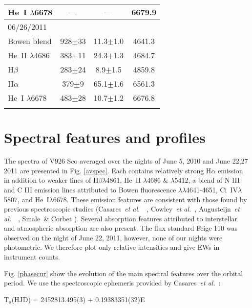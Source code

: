 \documentclass{aa}
\def\etal{{\em et al.}\ }
\begin{document}
\begin{table}
\begin{tabular}{lccc}
		He~I $\lambda$6678&---&---&6679.9\\
\hline
06/26/2011&&&\\
                Bowen blend &928$\pm$33&11.3$\pm$1.0&4641.3\\
                He~II $\lambda$4686 &383$\pm$11&24.3$\pm$1.3&4684.7\\
                H$\beta$&283$\pm$24&8.9$\pm$1.5&4859.8\\
                H$\alpha$&379$\pm$9&65.1$\pm$1.6&6561.3\\
		He~I $\lambda$6678&483$\pm$28&10.7$\pm$1.2&6676.8\\ 
            \noalign{\smallskip}
            \hline
         \end{tabular}
   \end{table}

\section{Spectral features and profiles}
%

The spectra of V926 Sco averaged over the nights of June 5, 2010 and
June 22,27 2011 are presented in Fig. \ref{avspec}. Each contains relatively strong H$\alpha$ emission in addition to weaker lines of H$\beta\lambda$4861, He~II $\lambda$4686 \& $\lambda$5412, a blend of N III and C III emission lines attributed to Bowen fluorescence 
$\lambda\lambda$4641-4651, Ci~IV$\lambda$5807, 
and He~I$\lambda$6678. These emission features are consistent with those found by previous spectroscopic studies (Casares~\etal~\cite{casares}, Cowley~\etal \cite{cowley}, Augusteijn~\etal~\cite{august},
Smale~\& Corbet \cite{smalecorbet}). 
Several absorption features attributed to interstellar and atmospheric absorption  
are also present.
The flux standard Feige 110 was observed on the night of June 22, 2011, however,
none of our nights were photometric.
We therefore plot only relative intensities and give EWs in instrument counts.

Fig. \ref{phasecur} show the evolution of the main spectral features over
the orbital period.  We use the spectroscopic ephemeris provided by Casares~\etal: 

T$_o$(HJD) = 2452813.495(3) + 0.19383351(32)E
\end{document}
